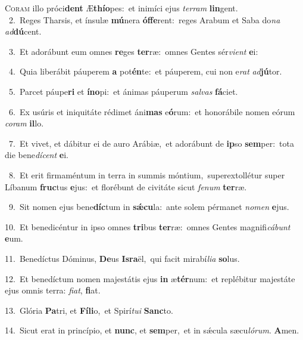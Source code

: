 \lettrine{\initial\textcolor{\initialcolor}{C}}{oram} illo próci\textbf{dent} Æ\-\textbf{thí}\-\textbf{o}pes:~\star et inimíci ejus \textit{ter}\-\textit{ram} \textbf{lin}\-gent.\\
{\numbfont\textcolor{\numbcolor}{~2.}}~Reges Tharsis, et ínsulæ \textbf{mú}\-nera \textbf{óf}\-\textbf{fe}rent:~\star reges Arabum et Saba do\textit{na} \textit{ad}\-\textbf{dú}cent.\par
{\numbfont\textcolor{\numbcolor}{~3.}}~Et adorábunt eum omnes \textbf{re}\-ges \textbf{ter}\-ræ:~\star omnes Gentes sér\-\textit{vi}\-\textit{ent} \textbf{e}\-i:\par
{\numbfont\textcolor{\numbcolor}{~4.}}~Quia liberábit páuperem \textbf{a} pot\-\textbf{én}\-te:~\star et páuperem, cui non e\textit{rat} \textit{ad}\-\textbf{jú}tor.\par
{\numbfont\textcolor{\numbcolor}{~5.}}~Parcet páupe\textbf{ri} et \textbf{ín}\-\textbf{o}pi:~\star et ánimas páuperum \textit{sal}\-\textit{vas} \textbf{fá}\-ciet.\par
{\numbfont\textcolor{\numbcolor}{~6.}}~Ex usúris et iniquitáte rédimet áni\textbf{mas} e\-\textbf{ó}\-rum:~\star et honorábile nomen eórum \textit{co}\-\textit{ram} \textbf{il}\-lo.\par
{\numbfont\textcolor{\numbcolor}{~7.}}~Et vivet, et dábitur ei de auro Arábiæ,~\dagger et adorábunt de \textbf{ip}\-so \textbf{sem}\-per:~\star tota die bene\-\textit{dí}\-\textit{cent} \textbf{e}\-i.\par
{\numbfont\textcolor{\numbcolor}{~8.}}~Et erit firmaméntum in terra in summis móntium,~\dagger superextollétur super Líbanum \textbf{fruc}\-tus \textbf{e}\-jus:~\star et florébunt de civitáte sicut \textit{fe}\-\textit{num} \textbf{ter}\-ræ.\par
{\numbfont\textcolor{\numbcolor}{~9.}}~Sit nomen ejus bene\-\textbf{díc}\-tum in \textbf{sǽ}\-\textbf{cu}la:~\star ante solem pérmanet \textit{no}\-\textit{men} \textbf{e}\-jus.\par
{\numbfont\textcolor{\numbcolor}{10.}}~Et benedicéntur in ipso omnes \textbf{tri}\-bus \textbf{ter}\-ræ:~\star omnes Gentes magnifi\-\textit{cá}\-\textit{bunt} \textbf{e}\-um.\par
{\numbfont\textcolor{\numbcolor}{11.}}~Benedíctus Dóminus, \textbf{De}\-us \textbf{Is}\-\textbf{ra}ël,~\star qui facit mirabí\-\textit{li}\-\textit{a} \textbf{so}\-lus.\par
{\numbfont\textcolor{\numbcolor}{12.}}~Et benedíctum nomen majestátis ejus \textbf{in} æ\-\textbf{tér}\-num:~\star et replébitur majestáte ejus omnis terra: \textit{fi}\-\textit{at}, \textbf{fi}\-at.\par
{\numbfont\textcolor{\numbcolor}{13.}}~Glória \textbf{Pa}\-tri, et \textbf{Fí}\-\textbf{li}o,~\star et Spirí\-\textit{tu}\-\textit{i} \textbf{Sanc}\-to.\par
{\numbfont\textcolor{\numbcolor}{14.}}~Sicut erat in princípio, et \textbf{nunc}\-, et \textbf{sem}\-per,~\star et in sǽcula sæcu\-\textit{ló}\-\textit{rum}. \textbf{A}\-men.\par
